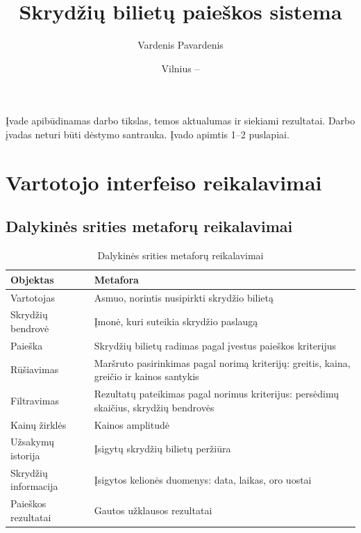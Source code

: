 \documentclass{VUMIFPSkursinis}
\title{Skrydžių bilietų paieškos sistema}
\author{Vardenis Pavardenis}
\date{Vilnius – \the\year}
\begin{document}
\maketitle

\tableofcontents

Įvade apibūdinamas darbo tikslas, temos aktualumas ir siekiami rezultatai.
Darbo įvadas neturi būti dėstymo santrauka. Įvado apimtis 1–2 puslapiai.

\section{Vartotojo interfeiso reikalavimai}

\subsection{Dalykinės srities metaforų reikalavimai}

\begin{table}[H]\footnotesize
  \centering
  \caption{Dalykinės srities metaforų reikalavimai}
  {\begin{tabular}{|l|l|} \hline
    Objektas & Metafora \\
    \hline
    \hline
    Vartotojas  & Asmuo, norintis nusipirkti skrydžio bilietą \\
    \hline
    Skrydžių bendrovė  & Įmonė, kuri suteikia skrydžio paslaugą \\
    \hline
    Paieška & Skrydžių bilietų radimas pagal įvestus paieškos kriterijus \\
    \hline
    Rūšiavimas & Maršruto pasirinkimas pagal norimą kriterijų: greitis, kaina, greičio ir kainos santykis \\
    \hline
    Filtravimas & Rezultatų pateikimas pagal norimus kriterijus: persėdimų skaičius, skrydžių bendrovės \\
    \hline
    Kainų žirklės & Kainos amplitudė \\
    \hline
    Užsakymų istorija & Įsigytų skrydžių bilietų peržiūra \\
    \hline
    Skrydžių informacija & Įsigytos kelionės duomenys: data, laikas, oro uostai \\
    \hline
    Paieškos rezultatai & Gautos užklausos rezultatai \\
    \hline
  \end{tabular}}
  \label{tab:table example}
\end{table}
\end{document}
